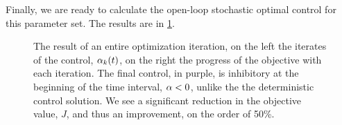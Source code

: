 \documentclass{article}
\begin{document}
Finally, we are ready to calculate the open-loop stochastic optimal control for
this parameter set. The results are in
\cref{fig:FP_adjoint_objective_control_convergence}.
\begin{figure}[h]
\begin{center}
\caption[ ]{The result of an entire optimization iteration, on the left the
iterates of the control, ${\alpha}_k(t)$, on the right the progress of the
objective with each iteration. The final control, in purple, is inhibitory at
the beginning of the time interval, ${\alpha} < 0$, unlike the the deterministic
control solution. 
We see a significant
reduction in the objective value, $J$, and thus an improvement, on the
order of 50\%.}
\label{fig:FP_adjoint_objective_control_convergence}
\end{center}
\end{figure}
\end{document}
